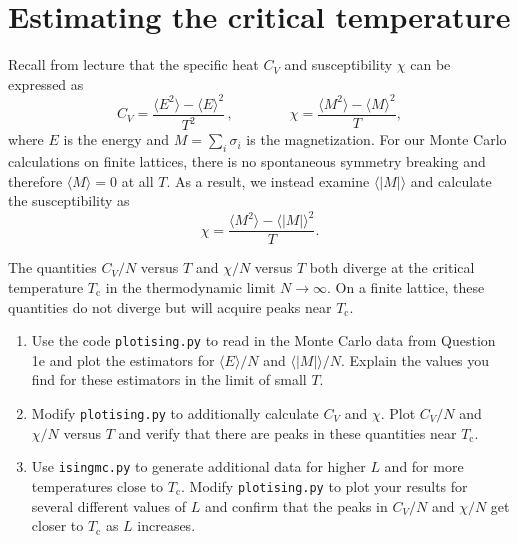 \documentclass[letterpaper]{scrartcl}
\begin{document}
\section{Estimating the critical temperature}

Recall from lecture that the specific heat $C_V$ and susceptibility $\chi$ can be expressed as 
\begin{equation*}
C_V = \frac{\langle E^2 \rangle - \langle E \rangle^2}{T^2} \, , \qquad \qquad
\chi = \frac{\langle M^2 \rangle - \langle M \rangle^2}{T},
\end{equation*}
where $E$ is the energy and $M = \sum_i \sigma_i$ is the magnetization.
For our Monte Carlo calculations on finite lattices, there is no spontaneous symmetry breaking and therefore $\langle M \rangle = 0$ at all $T$. 
As a result, we instead examine $\langle | M | \rangle$ and calculate the susceptibility as
\begin{equation*}
\chi = \frac{\langle M^2 \rangle - \langle | M | \rangle^2}{T}.
\end{equation*}

The quantities $C_V/N$ versus $T$ and $\chi/N$ versus $T$ both diverge at the critical temperature $T_\text{c}$ in the thermodynamic limit $N \to \infty$.
On a finite lattice, these quantities do not diverge but will acquire peaks near $T_\text{c}$. 

\begin{enumerate}[label=\alph*)]

\item Use the code \texttt{plot{\textunderscore}ising.py} to read in the Monte Carlo data from Question 1e 
and plot the estimators for $\langle E \rangle/N$ and $\langle | M | \rangle/N$.
Explain the values you find for these estimators in the limit of small $T$.

\item Modify \texttt{plot{\textunderscore}ising.py} to additionally calculate $C_V$ and $\chi$. 
Plot $C_V/N$ and $\chi/N$ versus $T$ and verify that there are peaks in these quantities near $T_\text{c}$.

\item Use \texttt{ising{\textunderscore}mc.py} to generate additional data for higher $L$ and for more temperatures close to $T_\text{c}$. 
Modify \texttt{plot{\textunderscore}ising.py} to plot your results for several different values of $L$ and confirm that the peaks in $C_V/N$ and $\chi/N$
get closer to $T_\text{c}$ as $L$ increases.

\end{enumerate}
\end{document}
